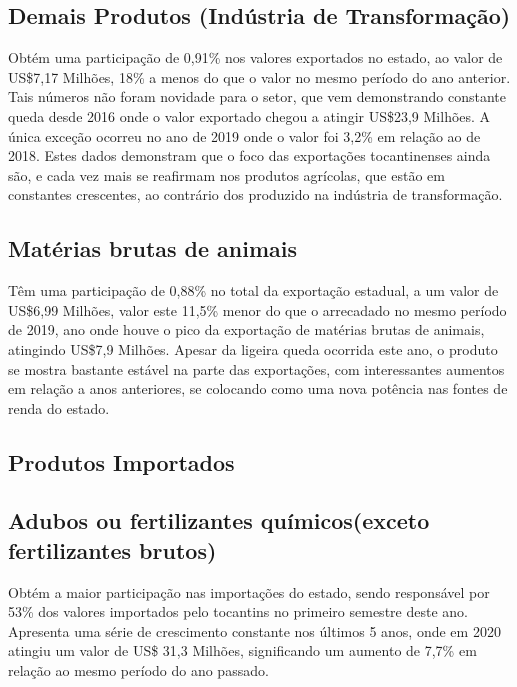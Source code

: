 \subsection {Demais Produtos (Indústria de Transformação)}
\par Obtém uma participação de 0,91\% nos valores exportados no estado, ao valor de US\$7,17 Milhões, 18\% a menos do que o valor no mesmo período do ano anterior. Tais números não foram novidade para o setor, que vem demonstrando constante queda desde 2016 onde o valor exportado chegou a atingir US\$23,9 Milhões. A única exceção ocorreu no ano de 2019 onde o valor foi 3,2\% em relação ao de 2018. Estes dados demonstram que o foco das exportações tocantinenses ainda são, e cada vez mais se reafirmam nos produtos agrícolas, que estão em constantes crescentes, ao contrário dos produzido na indústria de transformação. 

\subsection{Matérias brutas de animais}
\par Têm uma participação de 0,88\% no total da exportação estadual, a um valor de US\$6,99 Milhões, valor este 11,5\% menor do que o arrecadado no mesmo período de 2019, ano onde houve o pico da exportação de matérias brutas de animais, atingindo US\$7,9 Milhões. Apesar da ligeira queda ocorrida este ano, o produto se mostra bastante estável na parte das exportações, com interessantes aumentos em relação a anos anteriores, se colocando como uma nova potência nas fontes de renda do estado.

\subsection{Produtos Importados}

\subsection{Adubos ou fertilizantes químicos(exceto fertilizantes brutos)}
\par Obtém a maior participação nas importações do estado, sendo responsável por 53\% dos valores importados pelo tocantins no primeiro semestre deste ano. Apresenta uma série de crescimento constante nos últimos 5 anos, onde em 2020 atingiu um valor de US\$ 31,3 Milhões, significando um aumento de 7,7\% em relação ao mesmo período do ano passado.

